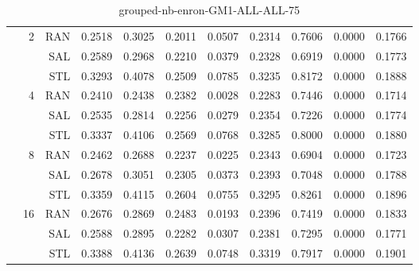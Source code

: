 \begin{center}
\begin{table}[htbp]
\begin{tabular}{ | r | r | r | r | r | r | r | r | r | r | r |}
 & \multirow{3}{*}{2} & RAN & 0.2518 & 0.3025 & 0.2011 & 0.0507 & 0.2314 & 0.7606 & 0.0000 & 0.1766\\ \cline{3-11}
 &   & SAL & 0.2589 & 0.2968 & 0.2210 & 0.0379 & 0.2328 & 0.6919 & 0.0000 & 0.1773\\ \cline{3-11}
 &   & STL & 0.3293 & 0.4078 & 0.2509 & 0.0785 & 0.3235 & 0.8172 & 0.0000 & 0.1888\\ \cline{2-11}
 & \multirow{3}{*}{4} & RAN & 0.2410 & 0.2438 & 0.2382 & 0.0028 & 0.2283 & 0.7446 & 0.0000 & 0.1714\\ \cline{3-11}
 &   & SAL & 0.2535 & 0.2814 & 0.2256 & 0.0279 & 0.2354 & 0.7226 & 0.0000 & 0.1774\\ \cline{3-11}
 &   & STL & 0.3337 & 0.4106 & 0.2569 & 0.0768 & 0.3285 & 0.8000 & 0.0000 & 0.1880\\ \cline{2-11}
 & \multirow{3}{*}{8} & RAN & 0.2462 & 0.2688 & 0.2237 & 0.0225 & 0.2343 & 0.6904 & 0.0000 & 0.1723\\ \cline{3-11}
 &   & SAL & 0.2678 & 0.3051 & 0.2305 & 0.0373 & 0.2393 & 0.7048 & 0.0000 & 0.1788\\ \cline{3-11}
 &   & STL & 0.3359 & 0.4115 & 0.2604 & 0.0755 & 0.3295 & 0.8261 & 0.0000 & 0.1896\\ \cline{2-11}
 & \multirow{3}{*}{16} & RAN & 0.2676 & 0.2869 & 0.2483 & 0.0193 & 0.2396 & 0.7419 & 0.0000 & 0.1833\\ \cline{3-11}
 &   & SAL & 0.2588 & 0.2895 & 0.2282 & 0.0307 & 0.2381 & 0.7295 & 0.0000 & 0.1771\\ \cline{3-11}
 &   & STL & 0.3388 & 0.4136 & 0.2639 & 0.0748 & 0.3319 & 0.7917 & 0.0000 & 0.1901\\ \cline{2-11}
\hline
\end{tabular}
\caption{grouped-nb-enron-GM1-ALL-ALL-75}
\end{table}
\end{center}

